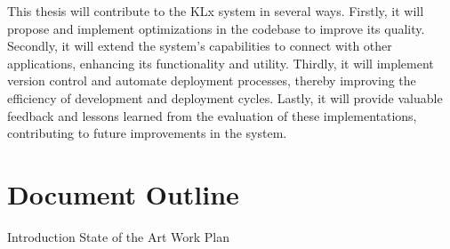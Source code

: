 This thesis will contribute to the KLx system in several ways. Firstly, it will propose and implement optimizations in the codebase to improve its quality. Secondly, it will extend the system’s capabilities to connect with other applications, enhancing its functionality and utility. Thirdly, it will implement version control and automate deployment processes, thereby improving the efficiency of development and deployment cycles. Lastly, it will provide valuable feedback and lessons learned from the evaluation of these implementations, contributing to future improvements in the system.

\section{Document Outline}

Introduction
State of the Art
Work Plan